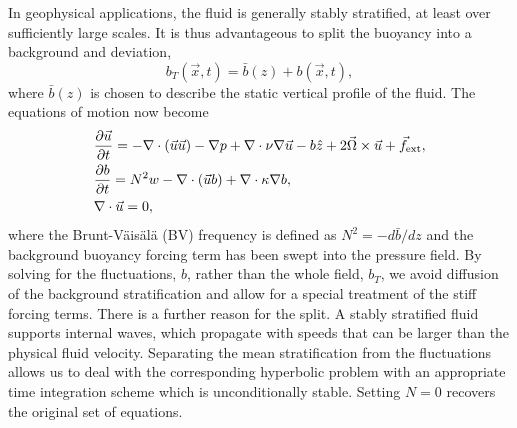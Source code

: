 \documentclass[12pt]{article}
\begin{document}
In geophysical applications, the fluid is generally stably stratified, at least
over  sufficiently large scales. 
It is thus advantageous to split the buoyancy into a
background and deviation, 
\begin{equation*}
	b_T(\vec{x},t) = \bar{b}(z) + b(\vec{x},t),
\end{equation*}
where $\bar{b}(z)$ is chosen to describe the static vertical profile of the
fluid. The equations of motion now become
\begin{subequations}\label{BVNSE}
  \begin{align}
    &\frac{\partial {\vec{u}}}{\partial t} = -\nabla\cdot\left(\vec{u} \vec{u}\right) - \nabla p +
      \nabla\cdot{\nu\nabla\vec{u}} - b\hat{z} + 2\vec{\Omega}\times\vec{u} + \vec{f}_\text{ext}, \\
    &\frac{\partial {b}}{\partial t} = N^2 w -\nabla \cdot \left( \vec{u} b \right) + \nabla\cdot\kappa\nabla b,\\
    &\nabla \cdot \vec{u} = 0,
  \end{align}
\end{subequations} 
where the Brunt-V\"ais\"al\"a (BV) frequency is defined as $N^2=-d\bar{b}/dz$ and the background buoyancy forcing term has been swept into the pressure field. 
By solving for the fluctuations, $b$, rather than the whole field, $b_T$,
 we avoid diffusion of the background stratification and
allow for a special treatment of the stiff forcing terms.  There is a further reason for the
split. A stably stratified fluid supports internal waves, which propagate with
speeds that can be  larger than the physical fluid velocity.  Separating the mean stratification from the
fluctuations allows us to deal with  the corresponding hyperbolic problem with
an appropriate time integration scheme which is unconditionally stable.   
Setting $N=0$
recovers the original set of equations.
\\
\end{document}
